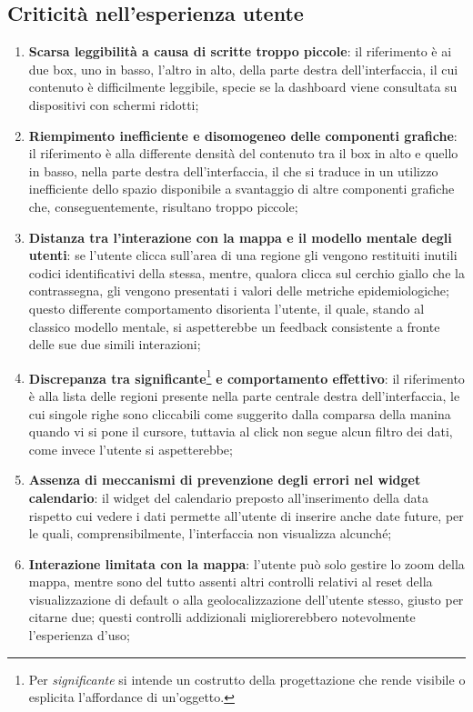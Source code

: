 \documentclass[../../main.tex]{subfiles}
\begin{document}
\subsection{Criticità nell'esperienza utente}\label{ss:criticita}
\begin{enumerate}
    \item \textbf{Scarsa leggibilità a causa di scritte troppo piccole}: il riferimento è ai due box, uno in basso, l'altro in alto, della parte destra dell'interfaccia, il cui contenuto è difficilmente leggibile, specie se la dashboard viene consultata su dispositivi con schermi ridotti; \label{el:1}
    \item \textbf{Riempimento inefficiente e disomogeneo delle componenti grafiche}: il riferimento è alla differente densità del contenuto tra il box in alto e quello in basso, nella parte destra dell'interfaccia, il che si traduce in un utilizzo inefficiente dello spazio disponibile a svantaggio di altre componenti grafiche che, conseguentemente, risultano troppo piccole;\label{el:2}
    \item \textbf{Distanza tra l'interazione con la mappa e il modello mentale degli utenti}: se l'utente clicca sull'area di una regione gli vengono restituiti inutili codici identificativi della stessa, mentre, qualora clicca sul cerchio giallo che la contrassegna, gli vengono presentati i valori delle metriche epidemiologiche; questo differente comportamento disorienta l'utente, il quale, stando al classico modello mentale, si aspetterebbe un feedback consistente a fronte delle sue due simili interazioni;\label{el:3}
    \item \textbf{Discrepanza tra significante}\footnote{Per \textit{significante} si intende un costrutto della progettazione che rende visibile o esplicita l'affordance di un'oggetto.}  \textbf{e comportamento effettivo}: il riferimento è alla lista delle regioni presente nella parte centrale destra dell'interfaccia, le cui singole righe sono cliccabili come suggerito dalla comparsa della manina quando vi si pone il cursore, tuttavia al click non segue alcun filtro dei dati, come invece l'utente si aspetterebbe;\label{el:4}
    \item \textbf{Assenza di meccanismi di prevenzione degli errori nel widget calendario}: il widget del calendario preposto all'inserimento della data rispetto cui vedere i dati permette all'utente di inserire anche date future, per le quali, comprensibilmente, l'interfaccia non visualizza alcunché;\label{el:5}
    \item \textbf{Interazione limitata con la mappa}: l'utente può solo gestire lo zoom della mappa, mentre sono del tutto assenti altri controlli relativi al reset della visualizzazione di default o alla geolocalizzazione dell'utente stesso, giusto per citarne due; questi controlli addizionali migliorerebbero notevolmente l'esperienza d'uso;\label{el:6}

\end{enumerate}
\end{document}
